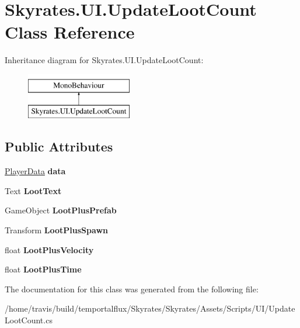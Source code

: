 \hypertarget{class_skyrates_1_1_u_i_1_1_update_loot_count}{\section{Skyrates.\-U\-I.\-Update\-Loot\-Count Class Reference}
\label{class_skyrates_1_1_u_i_1_1_update_loot_count}
}
Inheritance diagram for Skyrates.\-U\-I.\-Update\-Loot\-Count\-:\begin{figure}[H]
\begin{center}
\leavevmode
\includegraphics[height=2.000000cm]{class_skyrates_1_1_u_i_1_1_update_loot_count}
\end{center}
\end{figure}
\subsection*{Public Attributes}
\begin{DoxyCompactItemize}
\item 
\hypertarget{class_skyrates_1_1_u_i_1_1_update_loot_count_aed451b6e8083555433cacbbfc9cca00c}{\hyperlink{class_skyrates_1_1_data_1_1_player_data}{Player\-Data} {\bfseries data}}\label{class_skyrates_1_1_u_i_1_1_update_loot_count_aed451b6e8083555433cacbbfc9cca00c}

\item 
\hypertarget{class_skyrates_1_1_u_i_1_1_update_loot_count_a7ed89cca249eaec301582920f1feb066}{Text {\bfseries Loot\-Text}}\label{class_skyrates_1_1_u_i_1_1_update_loot_count_a7ed89cca249eaec301582920f1feb066}

\item 
\hypertarget{class_skyrates_1_1_u_i_1_1_update_loot_count_a0796c330e95fbaaf5d3c36f4b04e2e04}{Game\-Object {\bfseries Loot\-Plus\-Prefab}}\label{class_skyrates_1_1_u_i_1_1_update_loot_count_a0796c330e95fbaaf5d3c36f4b04e2e04}

\item 
\hypertarget{class_skyrates_1_1_u_i_1_1_update_loot_count_a9d071400515d16c1832df734a4baaee8}{Transform {\bfseries Loot\-Plus\-Spawn}}\label{class_skyrates_1_1_u_i_1_1_update_loot_count_a9d071400515d16c1832df734a4baaee8}

\item 
\hypertarget{class_skyrates_1_1_u_i_1_1_update_loot_count_a77803260af61d2f2d9d3f629545a79ad}{float {\bfseries Loot\-Plus\-Velocity}}\label{class_skyrates_1_1_u_i_1_1_update_loot_count_a77803260af61d2f2d9d3f629545a79ad}

\item 
\hypertarget{class_skyrates_1_1_u_i_1_1_update_loot_count_a1502dbea347d61d5c6abc3b95018d971}{float {\bfseries Loot\-Plus\-Time}}\label{class_skyrates_1_1_u_i_1_1_update_loot_count_a1502dbea347d61d5c6abc3b95018d971}

\end{DoxyCompactItemize}


The documentation for this class was generated from the following file\-:\begin{DoxyCompactItemize}
\item 
/home/travis/build/temportalflux/\-Skyrates/\-Skyrates/\-Assets/\-Scripts/\-U\-I/Update\-Loot\-Count.\-cs\end{DoxyCompactItemize}
